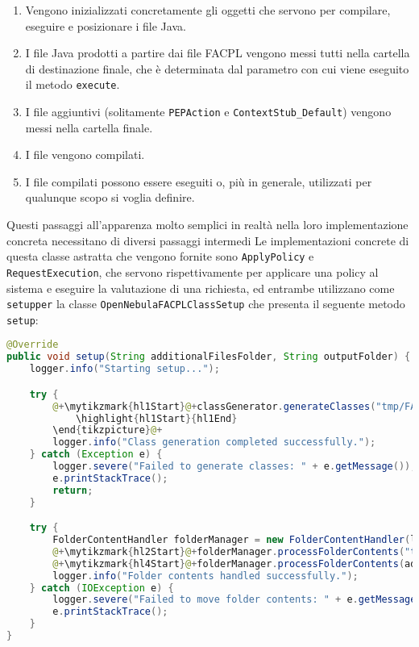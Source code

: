 \begin{enumerate}
    \item Vengono inizializzati concretamente gli oggetti che servono per compilare, eseguire e posizionare i file Java.
    \item I file Java prodotti a partire dai file FACPL vengono messi tutti nella cartella di destinazione finale, che è determinata dal parametro con cui viene eseguito il metodo \texttt{execute}.
    \item I file aggiuntivi (solitamente \texttt{PEPAction} e \texttt{ContextStub\_Default}) vengono messi nella cartella finale.
    \item I file vengono compilati.
    \item I file compilati possono essere eseguiti o, più in generale, utilizzati per qualunque scopo si voglia definire.
\end{enumerate}
Questi passaggi all'apparenza molto semplici in realtà nella loro implementazione concreta necessitano di diversi passaggi intermedi\medbreak
Le implementazioni concrete di questa classe astratta che vengono fornite sono \texttt{ApplyPolicy} e \texttt{RequestExecution}, che servono rispettivamente per applicare una policy al sistema e eseguire la valutazione di una richiesta, ed entrambe utilizzano come \texttt{setupper} la classe \texttt{OpenNebulaFACPLClassSetup} che presenta il seguente metodo \texttt{setup}:
\begin{lstlisting}[language=Java, caption=Metodo di setup per OpenNebula, label=code:setupper]
@Override
public void setup(String additionalFilesFolder, String outputFolder) {
    logger.info("Starting setup...");

    try {
        @+\mytikzmark{hl1Start}@+classGenerator.generateClasses("tmp/FACPLFiles");@+\mytikzmark{hl1End}@+@+\begin{tikzpicture}[remember picture, overlay]
            \highlight{hl1Start}{hl1End}
        \end{tikzpicture}@+
        logger.info("Class generation completed successfully.");
    } catch (Exception e) {
        logger.severe("Failed to generate classes: " + e.getMessage());
        e.printStackTrace();
        return;
    }

    try {
        FolderContentHandler folderManager = new FolderContentHandler(logger);
        @+\mytikzmark{hl2Start}@+folderManager.processFolderContents("tmp/FACPLFiles/",@+\mytikzmark{hl2End}@+ @+\mytikzmark{hl3Start}@+outputFolder, new MoveStrategy());@+\mytikzmark{hl3End}@+
        @+\mytikzmark{hl4Start}@+folderManager.processFolderContents(additionalFilesFolder,@+\mytikzmark{hl4End}@+ @+\mytikzmark{hl5Start}@+outputFolder, new CopyStrategy());@+\mytikzmark{hl5End}@+
        logger.info("Folder contents handled successfully.");
    } catch (IOException e) {
        logger.severe("Failed to move folder contents: " + e.getMessage());
        e.printStackTrace();
    }
}
\end{lstlisting}

